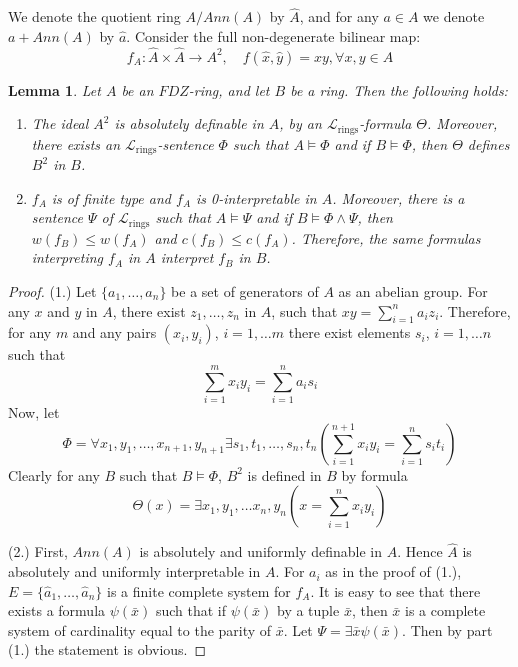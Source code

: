 \documentclass{article}
\newtheorem{lemma}[theorem]{Lemma}
\theoremstyle{remark}
\newcommand{\Lrings}{\mathcal{L}_{\text{rings}}}
\def\barA{\hat{A}}
\def\bara{\hat{a}}
\def\barx{\hat{x}}
\def\bary{\hat{y}}
\begin{document}
 We denote the quotient ring $A/Ann(A)$ by $\barA$, and for any $a\in A$ we denote $a+Ann(A)$ by $\bara$. Consider the full non-degenerate bilinear map:
$$f_A: \barA \times \barA\to A^2, \quad f(\barx,\bary)=xy, \forall x,y\in A$$


\begin{lemma}\label{lem:ft}
 Let $A$ be an $FDZ$-ring, and let $B$ be a ring. Then the following holds:
 \begin{enumerate}
     \item The ideal $A^2$ is absolutely definable in $A$, by an $\Lrings$-formula $\Theta$. Moreover, there exists an $\Lrings$-sentence $\Phi$ such that $A\models \Phi$ and if $B\models \Phi$, then $\Theta$ defines $B^2$ in $B$.
     \item $f_A$ is of finite type and $f_A$ is 0-interpretable in $A$. Moreover, there is a sentence $\Psi$ of $\Lrings$ such that $A\models \Psi$ and if $B\models \Phi\wedge \Psi$, then  $w(f_B)\leq w(f_A)$ and $c(f_B)\leq c(f_A)$. Therefore, the same formulas interpreting  $f_A$ in $A$ interpret $f_B$ in $B$. \end{enumerate}
\end{lemma}
\begin{proof} 

(1.) Let $\{a_1, \ldots, a_n\}$ be a set of generators of $A$ as an abelian group. For any $x $ and $y$ in $A$, there exist $z_1, \ldots, z_n$ in $A$, such that $xy=\sum_{i=1}^n a_iz_i$. Therefore, for any $m$ and any pairs $(x_i,y_i)$, $i=1, \ldots m$ there exist elements $s_i$, $i=1,\ldots n$ such that
$$\sum_{i=1}^m x_iy_i = \sum_{i=1}^n a_i s_i$$
Now, let 
$$\Phi=\forall x_1,y_1, \ldots, x_{n+1},y_{n+1} \exists s_1,t_1,\ldots, s_n,t_n (\sum_{i=1}^{n+1} x_iy_i = \sum_{i=1}^{n} s_it_i)$$
Clearly for any $B$ such that $B\models \Phi$, $B^2$ is defined in $B$ 
by formula $$\Theta(x)= \exists x_1,y_1, \ldots x_n,y_n (x=\sum_{i=1}^{n} x_iy_i)$$


 (2.) First, $Ann(A)$ is absolutely and uniformly definable in $A$. Hence $\hat{A}$ is absolutely and uniformly interpretable in $A$. For $a_i$ as in the proof of (1.), $E=\{\bara_1, \ldots, \bara_n\}$ is a finite complete system for $f_A$. It is easy to see that there exists a formula $\psi(\bar{x})$ such that if $ \psi(\bar{x})$ by a tuple $\bar{x}$, then $\bar{x}$ is a complete system of cardinality equal to the parity of $\bar{x}$. Let $\Psi=\exists \bar{x} \psi(\bar{x})$.  Then by part (1.) the statement is obvious. \end{proof} 
\end{document}
